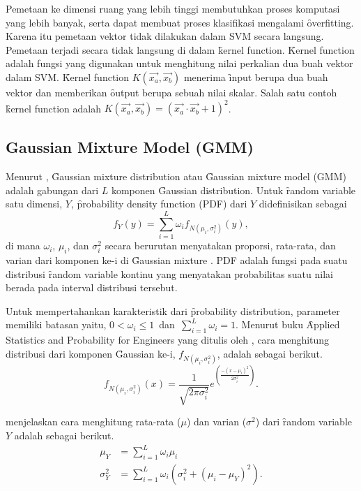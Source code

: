   Pemetaan ke dimensi ruang yang lebih tinggi membutuhkan proses komputasi yang lebih banyak, serta dapat membuat proses klasifikasi mengalami \f{overfitting}. Karena itu pemetaan vektor tidak dilakukan dalam SVM secara langsung. Pemetaan terjadi secara tidak langsung di dalam \f{kernel function}. \f{Kernel function} adalah fungsi yang digunakan untuk menghitung nilai perkalian dua buah vektor dalam SVM. \f{Kernel function} $K(\vec{x_a},\vec{x_b})$ menerima \f{input} berupa dua buah vektor dan memberikan \f{output} berupa sebuah nilai skalar. Salah satu contoh \f{kernel function} adalah $K(\vec{x_a},\vec{x_b}) = (\vec{x_a}\cdot\vec{x_b}+1)^2$.



  \subsection{Gaussian Mixture Model (GMM)}
  Menurut \cite{6235282}, \f{Gaussian mixture distribution} atau \f{Gaussian mixture model} (GMM) adalah gabungan dari $L$ komponen \f{Gaussian distribution}. Untuk \f{random variable} satu dimensi, $Y$, \f{probability density function (PDF)} dari $Y$ didefinisikan sebagai
  \begin{equation}
    f_Y(y) = \sum_{i=1}^{L}{\omega_i f_{N(\mu_i,\sigma^2_i)}(y)},
  \end{equation}
  di mana $\omega_i$, $\mu_i$, dan $\sigma^2_i$ secara berurutan menyatakan proporsi, rata-rata, dan varian dari komponen ke-i di \f{Gaussian mixture} \citep{4643623}. PDF adalah fungsi pada suatu distribusi \f{random variable} kontinu yang menyatakan probabilitas suatu nilai berada pada interval distribusi tersebut.

  Untuk mempertahankan karakteristik dari \f{probability distribution}, parameter memiliki batasan yaitu, $0<\omega_i\leq1$~dan~$\sum_{i=1}^{L}{\omega_i=1}$. Menurut buku \f{Applied Statistics and Probability for Engineers} yang ditulis oleh \cite{montgomery2013applied}, cara menghitung distribusi dari komponen \f{Gaussian} ke-i, $f_{N(\mu_i,\sigma^2_i)}$, adalah sebagai berikut.
  \begin{equation}
    f_{N(\mu_i,\sigma^2_i)}(x) = \frac{1}{\sqrt{2\pi\sigma^2_i}} e^{(\frac{-(x-\mu_i)^2}{2\sigma^2_i})}.
  \end{equation}

  \cite{5089549} menjelaskan cara menghitung rata-rata ($\mu$) dan varian ($\sigma^2$) dari \f{random variable} $Y$ adalah sebagai berikut.
  \begin{align}
    \mu_Y      &= \sum_{i=1}^{L}{\omega_i\mu_i}\\
    \sigma^2_Y &= \sum_{i=1}^{L}{\omega_i(\sigma^2_i+(\mu_i-\mu_Y)^2)}.
  \end{align}


